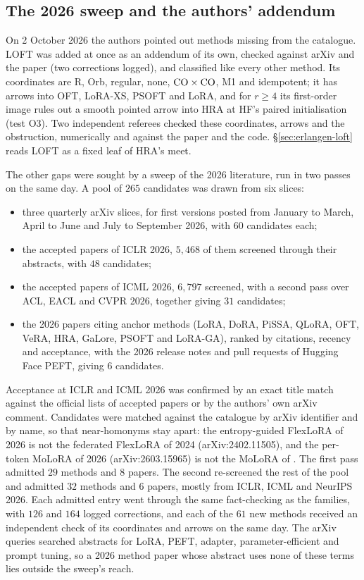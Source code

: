 \subsection{The 2026 sweep and the authors' addendum}\label{app:catalogue-2026}

On 2 October 2026 the authors pointed out methods missing from the catalogue. LOFT \citep{zhao2026loft} was added at once as an addendum of its own,
checked against arXiv and the paper (two corrections logged), and classified like every other method.
Its coordinates are R, Orb, regular, none, $\mathrm{CO}\times\mathrm{CO}$, M1 and idempotent; it has arrows into OFT, LoRA-XS, PSOFT
and LoRA, and for $r\ge4$ its first-order image rules out a smooth pointed arrow into HRA at HF's paired
initialisation (test O3). Two
independent referees checked these coordinates, arrows and the obstruction, numerically and against the paper and the
code. \S\ref{sec:erlangen-loft} reads LOFT as a fixed leaf of HRA's meet.

The other gaps were sought by a sweep of the 2026 literature, run in two passes on the same day. A pool of $265$ candidates was
drawn from six slices:
\begin{itemize}
  \item three quarterly arXiv slices, for first versions posted from January to March, April to June and July to
  September 2026, with $60$ candidates each;
  \item the accepted papers of ICLR 2026, $5{,}468$ of them screened through their abstracts, with $48$ candidates;
  \item the accepted papers of ICML 2026, $6{,}797$ screened, with a second pass over ACL, EACL and CVPR 2026, together
  giving $31$ candidates;
  \item the 2026 papers citing anchor methods (LoRA, DoRA, PiSSA, QLoRA, OFT, VeRA, HRA, GaLore, PSOFT and LoRA-GA),
  ranked by citations, recency and acceptance, with the 2026 release notes and pull requests of Hugging Face PEFT,
  giving $6$ candidates.
\end{itemize}
Acceptance at ICLR and ICML 2026 was confirmed by an exact title match against the official lists of accepted papers
or by the authors' own arXiv comment. Candidates were matched against the catalogue by arXiv identifier and by name, so that near-homonyms stay
apart: the entropy-guided FlexLoRA of 2026 \citep{liu2026flexlora} is not the federated FlexLoRA of 2024
(arXiv:2402.11505), and the per-token MoLoRA of 2026 (arXiv:2603.15965) is not the MoLoRA of \citet{zadouri2023pushing}.
The first pass admitted $29$ methods and $8$ papers. The second re-screened the rest of the pool and admitted $32$ methods
and $6$ papers, mostly from ICLR, ICML and NeurIPS 2026. Each admitted entry went through the same fact-checking as the
families, with $126$ and $164$ logged corrections, and each of the $61$ new methods received an independent check of its
coordinates and arrows on the same day. The arXiv queries searched abstracts for LoRA, PEFT, adapter,
parameter-efficient and prompt tuning, so a 2026 method paper whose abstract uses none of these terms lies outside the
sweep's reach.

